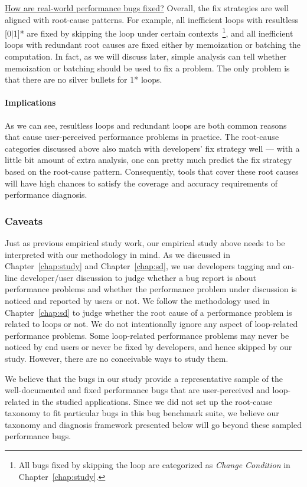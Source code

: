 \underline{How are real-world performance bugs fixed?}
Overall, the fix strategies are well aligned with root-cause patterns.
For example, 
all inefficient loops with resultless [0$|$1]* are
fixed by skipping the loop under certain contexts~\footnote{All bugs fixed by skipping the loop are 
categorized as \emph{Change Condition} in Chapter~\ref{chap:study}.},
and all inefficient loops with redundant root causes are fixed either by 
memoization or batching the computation. 
In fact, as we will discuss later, simple analysis can tell whether 
memoization or batching should be used to fix a problem.
The only problem is that there are no silver bullets for 1* loops.

\paragraph{Implications}
As we can see, resultless loops and redundant loops are both common reasons
that cause user-perceived performance problems in practice. The root-cause
categories discussed above also match with developers' fix strategy well ---
with a little bit amount of extra analysis, one can pretty much predict the fix strategy based on the root-cause pattern.
Consequently, tools that cover these root causes will have high
chances to satisfy the coverage and accuracy requirements of performance 
diagnosis.


\subsubsection{Caveats} 
Just as previous empirical study work, 
our empirical study above needs to be interpreted with our methodology in mind.
As we discussed in Chapter~\ref{chap:study} and Chapter~\ref{chap:sd}, 
we use developers tagging and
on-line developer/user discussion to judge whether a bug report is about
performance problems and whether 
the performance problem under discussion is noticed and reported by users
or not.
We follow the methodology used in Chapter~\ref{chap:sd} to judge 
whether the root cause of a performance problem is related to loops or not.
We do not intentionally ignore any aspect of loop-related performance problems. 
Some loop-related performance problems may never be noticed by end users
or never be fixed by developers, and hence skipped by our study. However,
there are no conceivable ways to study them. 

We believe that the bugs in our study provide a representative sample of the 
well-documented and
fixed performance bugs that are user-perceived and loop-related in the studied 
applications. 
Since we did not set up the root-cause taxonomy to fit particular
bugs in this bug benchmark suite, we believe our taxonomy and diagnosis
framework presented below will go beyond these sampled performance bugs. 

